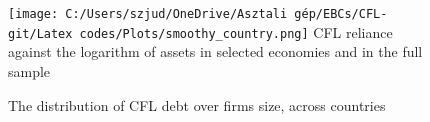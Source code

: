 \documentclass[12pt]{article}
\begin{document}
\begin{figure}[H]  %
    \centering
    \caption{The distribution of CFL debt over firms size, across countries} \label{chart:orb2}
    \texttt{[image: C:/Users/szjud/OneDrive/Asztali gép/EBCs/CFL-git/Latex codes/Plots/smoothy\_country.png]}
    \small CFL reliance against the logarithm of assets in selected economies and in the full sample
\end{figure}
\end{document}
